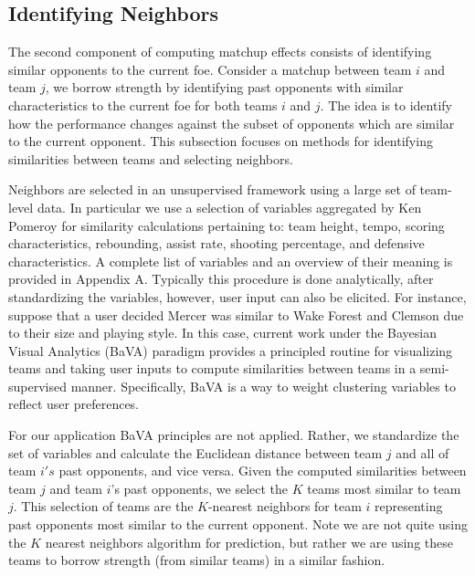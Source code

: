 \documentclass[letterpaper,12pt]{article}
\begin{document}
\subsection{Identifying Neighbors \label{sec:neighbors}}
The second component of computing matchup effects consists of identifying similar opponents to the current foe. Consider a matchup between team $i$ and team $j$, we borrow strength by identifying past opponents with similar characteristics to the current foe for both teams $i$ and $j$. The idea is to identify how the performance changes against the subset of opponents which are similar to the current opponent. This subsection focuses on methods for identifying similarities between teams and selecting neighbors.

Neighbors are selected in an unsupervised framework using a large set of team-level data. In particular we use a selection of variables aggregated by Ken Pomeroy \citep{kenpom.com} for similarity calculations pertaining to: team height, tempo, scoring characteristics, rebounding,  assist rate, shooting percentage, and defensive characteristics. A complete list of variables and an overview of their meaning is provided in Appendix A. Typically this procedure is done analytically, after standardizing the variables, however, user input can also be elicited. For instance, suppose that a user decided Mercer was similar to Wake Forest and Clemson due to their size and playing style. In this case, current work under the Bayesian Visual Analytics (BaVA) paradigm \citep{house2010, hu2013} provides a principled routine for visualizing teams and taking user inputs to compute similarities between teams in a semi-supervised manner. Specifically, BaVA is a way to weight clustering variables to reflect user preferences.

For our application BaVA principles are not applied. Rather, we standardize the set of variables and calculate the Euclidean distance between team $j$ and all of team $i's$ past opponents, and vice versa. Given the computed similarities between team $j$ and team $i$'s past opponents, we select the $K$ teams most similar to team $j$. This selection of teams are the $K$-nearest neighbors for team $i$ representing past opponents most similar to the current opponent. Note we are not quite using the $K$ nearest neighbors algorithm for prediction, but rather we are using these teams to borrow strength (from similar teams) in a similar fashion.
\end{document}
